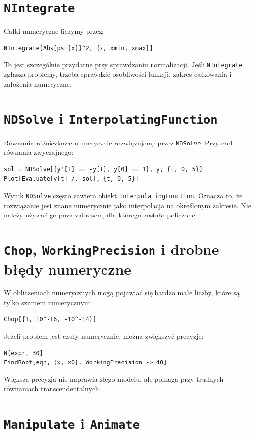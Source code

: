 \section{\texttt{NIntegrate}}

Całki numeryczne liczymy przez:
\begin{verbatim}
NIntegrate[Abs[psi[x]]^2, {x, xmin, xmax}]
\end{verbatim}
To jest szczególnie przydatne przy sprawdzaniu normalizacji. Jeśli \texttt{NIntegrate} zgłasza problemy, trzeba sprawdzić osobliwości funkcji, zakres całkowania i założenia numeryczne.

\section{\texttt{NDSolve} i \texttt{InterpolatingFunction}}

Równania różniczkowe numerycznie rozwiązujemy przez \texttt{NDSolve}. Przykład równania zwyczajnego:
\begin{verbatim}
sol = NDSolve[{y'[t] == -y[t], y[0] == 1}, y, {t, 0, 5}]
Plot[Evaluate[y[t] /. sol], {t, 0, 5}]
\end{verbatim}
Wynik \texttt{NDSolve} często zawiera obiekt \texttt{InterpolatingFunction}. Oznacza to, że rozwiązanie jest znane numerycznie jako interpolacja na określonym zakresie. Nie należy używać go poza zakresem, dla którego zostało policzone.

\section{\texttt{Chop}, \texttt{WorkingPrecision} i drobne błędy numeryczne}

W obliczeniach numerycznych mogą pojawiać się bardzo małe liczby, które są tylko szumem numerycznym:
\begin{verbatim}
Chop[{1, 10^-16, -10^-14}]
\end{verbatim}
Jeżeli problem jest czuły numerycznie, można zwiększyć precyzję:
\begin{verbatim}
N[expr, 30]
FindRoot[eqn, {x, x0}, WorkingPrecision -> 40]
\end{verbatim}
Większa precyzja nie naprawia złego modelu, ale pomaga przy trudnych równaniach transcendentalnych.

\section{\texttt{Manipulate} i \texttt{Animate}}

